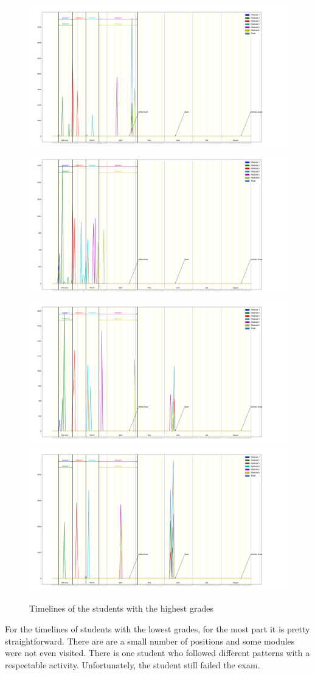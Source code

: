 \documentclass[a4paper,11pt]{report}
\numberwithin{figure}{section} %
\begin{document}
      \begin{figure}[H]
      \centering
  	  \includegraphics[width=.48\linewidth]{images/good_timeline_1747564.png}
  	  \includegraphics[width=.48\linewidth]{images/good_timeline_1793969.png}
      \\
      \includegraphics[width=.48\linewidth]{images/good_timeline_1942114.png}
      \includegraphics[width=.48\linewidth]{images/good_timeline_3554348.png}
      \caption{Timelines of the students with the highest grades}
      \label{fig:tm2}
      \end{figure}

    For the timelines of students with the lowest grades, for the most part it is pretty straightforward.
    There are are a small number of positions and some modules were not even visited.
    There is one student who followed different patterns with a respectable activity.
    Unfortunately, the student still failed the exam.\\
\end{document}
